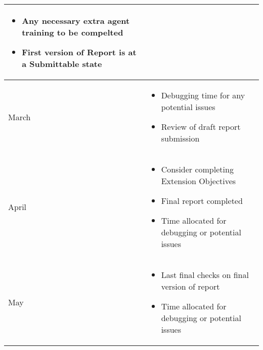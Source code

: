 \documentclass{surrey_disso_style}
\begin{document}
\begin{center}
\begin{tabular}{|p{1.6cm}|p{13cm}|}
\begin{itemize}
      \item Any necessary extra agent training to be compelted
      \item First version of Report is at a Submittable state
   \end{itemize}\\
   \hline
   March & \begin{itemize}
      \item Debugging time for any potential issues 
      \item Review of draft report submission
   \end{itemize}\\
   \hline
   April & \begin{itemize}
      \item Consider completing Extension Objectives
      \item Final report completed 
      \item Time allocated for debugging or potential issues
   \end{itemize}\\
   \hline
   May & \begin{itemize}
      \item Last final checks on final version of report
      \item Time allocated for debugging or potential issues
   \end{itemize}\\
   \hline

\end{tabular}
\end{center}

\appendix
%
%



\end{document}
